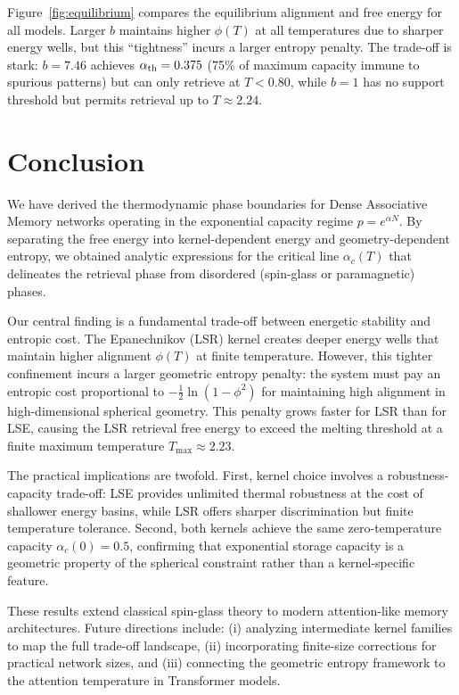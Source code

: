 \documentclass{article}
\theoremstyle{plain}
\theoremstyle{definition}
\theoremstyle{remark}
\begin{document}
Figure~\ref{fig:equilibrium} compares the equilibrium alignment and free energy for all models. Larger $b$ maintains higher $\phi(T)$ at all temperatures due to sharper energy wells, but this ``tightness'' incurs a larger entropy penalty. The trade-off is stark: $b = 7.46$ achieves $\alpha_{\rm th} = 0.375$ (75\% of maximum capacity immune to spurious patterns) but can only retrieve at $T < 0.80$, while $b = 1$ has no support threshold but permits retrieval up to $T \approx 2.24$.

\section{Conclusion}

We have derived the thermodynamic phase boundaries for Dense Associative Memory networks operating in the exponential capacity regime $p = e^{\alpha N}$. By separating the free energy into kernel-dependent energy and geometry-dependent entropy, we obtained analytic expressions for the critical line $\alpha_c(T)$ that delineates the retrieval phase from disordered (spin-glass or paramagnetic) phases.

Our central finding is a fundamental trade-off between energetic stability and entropic cost. The Epanechnikov (LSR) kernel creates deeper energy wells that maintain higher alignment $\phi(T)$ at finite temperature. However, this tighter confinement incurs a larger geometric entropy penalty: the system must pay an entropic cost proportional to $-\frac{1}{2}\ln(1-\phi^2)$ for maintaining high alignment in high-dimensional spherical geometry. This penalty grows faster for LSR than for LSE, causing the LSR retrieval free energy to exceed the melting threshold at a finite maximum temperature $T_{\max} \approx 2.23$.

The practical implications are twofold. First, kernel choice involves a robustness-capacity trade-off: LSE provides unlimited thermal robustness at the cost of shallower energy basins, while LSR offers sharper discrimination but finite temperature tolerance. Second, both kernels achieve the same zero-temperature capacity $\alpha_c(0) = 0.5$, confirming that exponential storage capacity is a geometric property of the spherical constraint rather than a kernel-specific feature.

These results extend classical spin-glass theory to modern attention-like memory architectures. Future directions include: (i) analyzing intermediate kernel families to map the full trade-off landscape, (ii) incorporating finite-size corrections for practical network sizes, and (iii) connecting the geometric entropy framework to the attention temperature in Transformer models.
\end{document}
